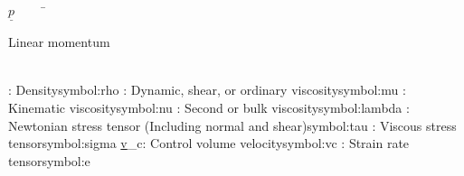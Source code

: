 \begin{tabbing}
  $\underline{p}$~~~~~\=\parbox{5in}{Linear momentum}\\
  \addsymbol{}\rho: {Density}{symbol:rho}
  \addsymbol{}\mu: {Dynamic, shear, or ordinary viscosity}{symbol:mu}
  \addsymbol{}\nu: {Kinematic viscosity}{symbol:nu}
  \addsymbol{}\lambda: {Second or bulk viscosity}{symbol:lambda}
  \addsymbol{}\uuline{\tau}: {Newtonian stress tensor (Including normal and shear)}{symbol:tau}
  \addsymbol{}\uuline{\sigma}: {Viscous stress tensor}{symbol:sigma}
  \addsymbol{}\underline{v}_{c}: {Control volume velocity}{symbol:vc}
  \addsymbol{}: {Strain rate tensor}{symbol:e}
\end{tabbing}
